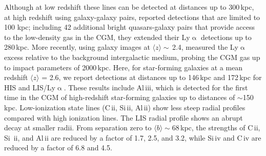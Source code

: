 \documentclass[longauth]{aa}
\begin{document}
Although at low redshift these lines can be detected at distances up to
300\,kpc, at high redshift using galaxy-galaxy pairs, 
\cite{Steidel10} reported detections that are limited to 100 kpc; including 42
additional bright quasars-galaxy pairs that provide access to the
low-density gas in the CGM, they extended their Ly$\upalpha$ detections up
to 280\,kpc. More recently, using galaxy images at $\langle
z \rangle \sim$\,2.4,
\cite{Chen20} measured the Ly$\upalpha$ excess relative to the background
intergalactic medium, probing the CGM gas up to impact parameters of
2000\,kpc. Here, for star-forming galaxies at a mean redshift $\langle
z \rangle$ = 2.6, we report detections at distances up to 146\,kpc and
172\,kpc  for HIS and LIS/Ly$\upalpha$. These results include
Al\,{\sc iii}, which is detected for the first time in the CGM of
high-redshift star-forming galaxies up to distances of $\sim$150\,kpc.
Low-ionization state lines (C\,{\sc ii}, Si\,{\sc ii}, Al\,{\sc ii}) show
less steep radial profiles compared with high ionization lines. The LIS
radial profile shows an abrupt decay at smaller radii. From separation zero
to $\langle b \rangle\sim 68$\,kpc, the strengths of C\,{\sc ii}, Si\,
{\sc ii}, and Al\,{\sc ii} are reduced by a factor of 1.7, 2.5, and 3.2,
while Si\,{\sc iv} and C\,{\sc iv} are reduced by a factor of 6.8 and 4.5.
\end{document}
